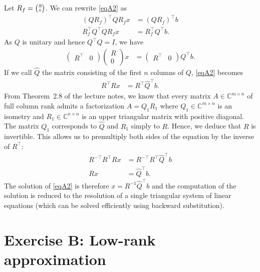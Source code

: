 \documentclass[11pt]{article}
\newcommand{\complex}{\mathbb{C}} %
\begin{document}
Let $\tiny{R_f=\begin{pmatrix}R\\0\end{pmatrix}}$.
We can rewrite \eqref{eqA2} as
\begin{align*}
(QR_f)^\top QR_fx &= (QR_f)^\top b\\
R_f^\top Q^\top QR_fx &= R_f^\top Q^\top b.
\end{align*}
As \(Q\) is unitary and hence $Q^\top Q=I$, we have
\begin{align*}
\begin{pmatrix}
R^\top & 0
\end{pmatrix}
\begin{pmatrix}
R\\ 0
\end{pmatrix}x
&=\begin{pmatrix}
R^\top & 0
\end{pmatrix}
Q^\top b.
\end{align*}
If we call $\hat{Q}$ the matrix consisting of the first \(n\) columns of \(Q\), \eqref{eqA2} becomes
\begin{align*}
R^\top Rx &= R^\top \hat{Q}^\top b.
\end{align*}
From Theorem~2.8 of the lecture notes, we know that every matrix $A\in\complex^{m\times n}$ of full column rank admits a factorization $A=Q_1R_1$ where $Q_1\in\complex^{m\times n}$ is an isometry and $R_1\in\complex^{n\times n}$ is an upper triangular matrix with positive diagonal.
The matrix $Q_1$ corresponds to $\hat{Q}$ and $R_1$ simply to $R$. Hence, we deduce that $R$ is invertible. This allows us to premultiply both sides of the equation by the inverse of $R^\top$:
\begin{align*}
R^{-\top}R^\top Rx &= R^{-\top}R^\top \hat{Q}^\top b\\
Rx &= \hat{Q}^\top b.
\end{align*}
The solution of \eqref{eqA2} is therefore $x=R^{-1}\hat{Q}^\top b$ and the computation of the solution is reduced to the resolution of a single triangular system of linear equations (which can be solved efficiently using backward substitution).


\section*{Exercise B: Low-rank approximation}
\end{document}
